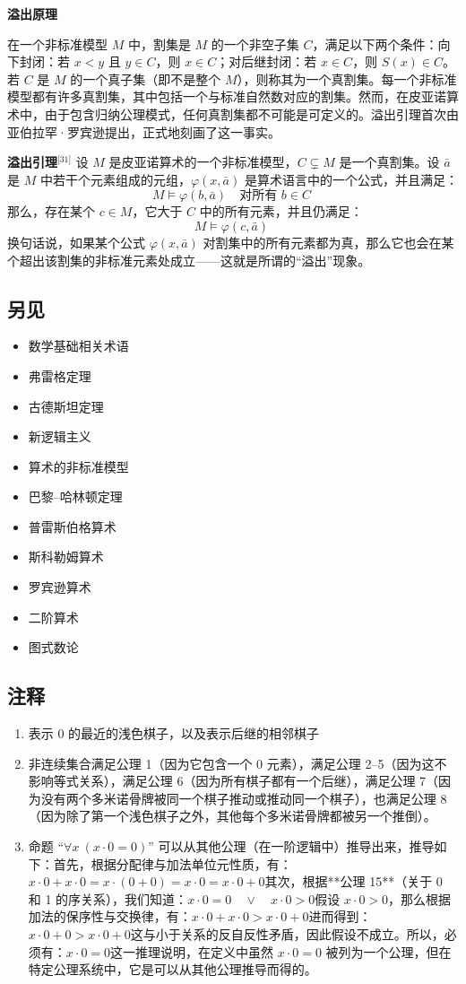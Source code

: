 \textbf{溢出原理}

在一个非标准模型 $M$ 中，割集是 $M$ 的一个非空子集 $C$，满足以下两个条件：向下封闭：若 $x < y$ 且 $y \in C$，则 $x \in C$；对后继封闭：若 $x \in C$，则 $S(x) \in C$。若 $C$ 是 $M$ 的一个真子集（即不是整个 $M$），则称其为一个真割集。每一个非标准模型都有许多真割集，其中包括一个与标准自然数对应的割集。然而，在皮亚诺算术中，由于包含归纳公理模式，任何真割集都不可能是可定义的。溢出引理首次由亚伯拉罕·罗宾逊提出，正式地刻画了这一事实。

\textbf{溢出引理}\(^\text{[31]}\) 设 $M$ 是皮亚诺算术的一个非标准模型，$C \subsetneq M$ 是一个真割集。设 $\bar{a}$ 是 $M$ 中若干个元素组成的元组，$\varphi(x, \bar{a})$ 是算术语言中的一个公式，并且满足：
$$
M \models \varphi(b, \bar{a}) \quad \text{对所有 } b \in C~
$$
那么，存在某个 $c \in M$，它大于 $C$ 中的所有元素，并且仍满足：
$$
M \models \varphi(c, \bar{a})~
$$
换句话说，如果某个公式 $\varphi(x, \bar{a})$ 对割集中的所有元素都为真，那么它也会在某个超出该割集的非标准元素处成立——这就是所谓的“溢出”现象。
\subsection{另见}
\begin{itemize}
\item 数学基础相关术语
\item 弗雷格定理
\item 古德斯坦定理
\item 新逻辑主义
\item 算术的非标准模型
\item 巴黎–哈林顿定理
\item 普雷斯伯格算术
\item 斯科勒姆算术
\item 罗宾逊算术
\item 二阶算术
\item 图式数论
\end{itemize}
\subsection{注释}
\begin{enumerate}
\item 表示 0 的最近的浅色棋子，以及表示后继的相邻棋子
\item 非连续集合满足公理 1（因为它包含一个 0 元素），满足公理 2–5（因为这不影响等式关系），满足公理 6（因为所有棋子都有一个后继），满足公理 7（因为没有两个多米诺骨牌被同一个棋子推动或推动同一个棋子），也满足公理 8（因为除了第一个浅色棋子之外，其他每个多米诺骨牌都被另一个推倒）。
\item 命题 “$\forall x \ (x \cdot 0 = 0)$” 可以从其他公理（在一阶逻辑中）推导出来，推导如下：首先，根据分配律与加法单位元性质，有：$x \cdot 0 + x \cdot 0 = x \cdot (0 + 0) = x \cdot 0 = x \cdot 0 + 0$其次，根据**公理 15**（关于 0 和 1 的序关系），我们知道：$x \cdot 0 = 0 \quad \lor \quad x \cdot 0 > 0$假设 $x \cdot 0 > 0$，那么根据加法的保序性与交换律，有：$x \cdot 0 + x \cdot 0 > x \cdot 0 + 0$进而得到：$x \cdot 0 + 0 > x \cdot 0 + 0$这与小于关系的反自反性矛盾，因此假设不成立。所以，必须有：$x \cdot 0 = 0$这一推理说明，在定义中虽然 $x \cdot 0 = 0$ 被列为一个公理，但在特定公理系统中，它是可以从其他公理推导而得的。
\end{enumerate}
